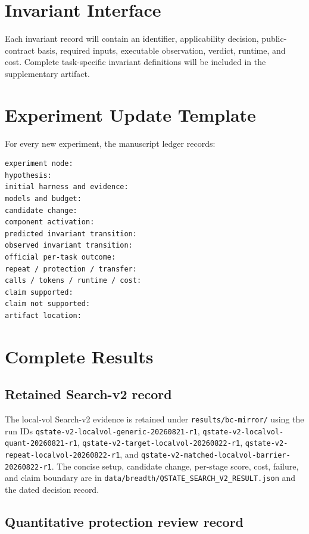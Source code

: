 \section{Invariant Interface}

Each invariant record will contain an identifier, applicability decision,
public-contract basis, required inputs, executable observation, verdict, runtime,
and cost. Complete task-specific invariant definitions will be included in the
supplementary artifact.

\section{Experiment Update Template}

For every new experiment, the manuscript ledger records:

\begin{verbatim}
experiment node:
hypothesis:
initial harness and evidence:
models and budget:
candidate change:
component activation:
predicted invariant transition:
observed invariant transition:
official per-task outcome:
repeat / protection / transfer:
calls / tokens / runtime / cost:
claim supported:
claim not supported:
artifact location:
\end{verbatim}

\section{Complete Results}


\subsection{Retained Search-v2 record}

The local-vol Search-v2 evidence is retained under
\texttt{results/bc-mirror/} using the run IDs
\texttt{qstate-v2-localvol-generic-20260821-r1},
\texttt{qstate-v2-localvol-quant-20260821-r1},
\texttt{qstate-v2-target-localvol-20260822-r1},
\texttt{qstate-v2-repeat-localvol-20260822-r1}, and
\texttt{qstate-v2-matched-localvol-barrier-20260822-r1}. The concise setup,
candidate change, per-stage score, cost, failure, and claim boundary are in
\texttt{data/breadth/QSTATE\_SEARCH\_V2\_RESULT.json} and the dated decision
record.

\subsection{Quantitative protection review record}

